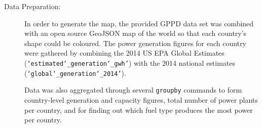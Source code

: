 \begin{description}
\item[Data Preparation:]
In order to generate the map, the provided GPPD data set was combined with an open source GeoJSON map of the world so that each country's shape could be coloured. The power generation figures for each country were gathered by combining the 2014 US EPA Global Estimates (\texttt{`estimated\char`_generation\char`_gwh'}) with the 2014 national estimates (\texttt{`global\char`_generation\char`_2014'}).

Data was also aggregated through several \texttt{groupby} commands to form country-level generation and capacity figures, total number of power plants per country, and for finding out which fuel type produces the most power per country.

\end{description}

